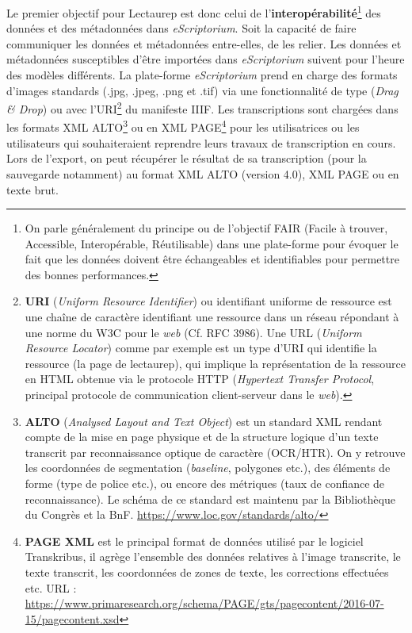 Le premier objectif pour Lectaurep est donc celui de l'\textbf{interopérabilité}\footnote{On parle généralement du principe ou de l'objectif FAIR (Facile à trouver, Accessible, Interopérable, Réutilisable) dans une plate-forme pour évoquer le fait que les données doivent être échangeables et identifiables pour permettre des bonnes performances.} des données et des métadonnées dans \textit{eScriptorium}. Soit la capacité de faire communiquer les données et métadonnées entre-elles, de les relier. Les données et métadonnées susceptibles d'être importées dans \textit{eScriptorium} suivent pour l'heure des modèles différents.
\newpage
La plate-forme \textit{eScriptorium} prend en charge des formats d'images standards (.jpg, .jpeg, .png et .tif) via une fonctionnalité de type  (\textit{Drag \& Drop}) ou avec l'URI\footnote{\textbf{URI} (\textit{Uniform Resource Identifier}) ou identifiant uniforme de ressource est une chaîne de caractère identifiant une ressource dans un réseau répondant à une norme du W3C pour le \textit{web} (Cf. RFC 3986). Une URL (\textit{Uniform Resource Locator}) comme par exemple  est un type d'URI qui identifie la ressource (la page de lectaurep), qui implique la représentation de la ressource en HTML obtenue via le protocole HTTP (\textit{Hypertext Transfer Protocol}, principal protocole de communication client-serveur dans le \textit{web}).} du manifeste IIIF. Les transcriptions sont chargées dans les formats XML ALTO\footnote{\textbf{ALTO} (\textit{Analysed Layout and Text Object}) est un standard XML rendant compte de la mise en page physique et de la structure logique d'un texte transcrit par reconnaissance optique de caractère (OCR/HTR). On y retrouve les coordonnées de segmentation (\textit{baseline}, polygones etc.), des éléments de forme (type de police etc.), ou encore des métriques (taux de confiance de reconnaissance). Le schéma de ce standard est maintenu par la Bibliothèque du Congrès et la BnF. \url{https://www.loc.gov/standards/alto/}} ou en XML PAGE\footnote{\textbf{PAGE XML} est le principal format de données utilisé par le logiciel Transkribus, il agrège l'ensemble des données relatives à l'image transcrite, le texte transcrit, les coordonnées de zones de texte, les corrections effectuées etc. URL : \url{https://www.primaresearch.org/schema/PAGE/gts/pagecontent/2016-07-15/pagecontent.xsd}} pour les utilisatrices ou les utilisateurs qui souhaiteraient reprendre leurs travaux de transcription en cours. Lors de l'export, on peut récupérer le résultat de sa transcription (pour la sauvegarde notamment) au format XML ALTO (version 4.0), XML PAGE ou en texte brut.\\

